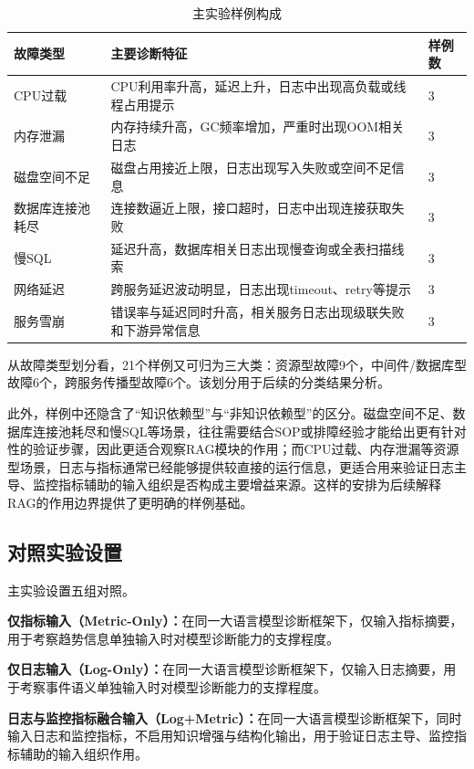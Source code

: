 \begin{table}[htbp]
\centering
\caption{主实验样例构成}
\label{tab:scene-family}
\small
\setlength{\tabcolsep}{4pt}
\renewcommand{\arraystretch}{1.12}
\begin{tabular}{p{2.6cm}p{6.4cm}p{1.6cm}}
\toprule
故障类型 & 主要诊断特征 & 样例数 \\
\midrule
CPU过载 & CPU利用率升高，延迟上升，日志中出现高负载或线程占用提示 & 3 \\
内存泄漏 & 内存持续升高，GC频率增加，严重时出现OOM相关日志 & 3 \\
磁盘空间不足 & 磁盘占用接近上限，日志出现写入失败或空间不足信息 & 3 \\
数据库连接池耗尽 & 连接数逼近上限，接口超时，日志中出现连接获取失败 & 3 \\
慢SQL & 延迟升高，数据库相关日志出现慢查询或全表扫描线索 & 3 \\
网络延迟 & 跨服务延迟波动明显，日志出现timeout、retry等提示 & 3 \\
服务雪崩 & 错误率与延迟同时升高，相关服务日志出现级联失败和下游异常信息 & 3 \\
\bottomrule
\end{tabular}
\end{table}

从故障类型划分看，21个样例又可归为三大类：资源型故障9个，中间件/数据库型故障6个，跨服务传播型故障6个。该划分用于后续的分类结果分析。

此外，样例中还隐含了“知识依赖型”与“非知识依赖型”的区分。磁盘空间不足、数据库连接池耗尽和慢SQL等场景，往往需要结合SOP或排障经验才能给出更有针对性的验证步骤，因此更适合观察RAG模块的作用；而CPU过载、内存泄漏等资源型场景，日志与指标通常已经能够提供较直接的运行信息，更适合用来验证日志主导、监控指标辅助的输入组织是否构成主要增益来源。这样的安排为后续解释RAG的作用边界提供了更明确的样例基础。

\subsection{对照实验设置}

主实验设置五组对照。

\textbf{仅指标输入（Metric-Only）：}在同一大语言模型诊断框架下，仅输入指标摘要，用于考察趋势信息单独输入时对模型诊断能力的支撑程度。

\textbf{仅日志输入（Log-Only）：}在同一大语言模型诊断框架下，仅输入日志摘要，用于考察事件语义单独输入时对模型诊断能力的支撑程度。

\textbf{日志与监控指标融合输入（Log+Metric）：}在同一大语言模型诊断框架下，同时输入日志和监控指标，不启用知识增强与结构化输出，用于验证日志主导、监控指标辅助的输入组织作用。

